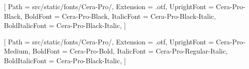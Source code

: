 
\contourlength{0.8pt}

\renewcommand{\ULdepth}{3.8pt}


\contourlength{0.8pt}

\renewcommand{\ULdepth}{3.8pt}

[
Path = src/static/fonts/Cera-Pro/,
Extension = .otf,
UprightFont = Cera-Pro-Black,
BoldFont = Cera-Pro-Black,
ItalicFont = Cera-Pro-Black-Italic,
BoldItalicFont = Cera-Pro-Black-Italic,
]

\setmainfont{Cera-Pro-Medium}[
Path = src/static/fonts/Cera-Pro/,
Extension = .otf,
UprightFont = Cera-Pro-Medium,
BoldFont = Cera-Pro-Bold,
ItalicFont = Cera-Pro-Regular-Italic,
BoldItalicFont = Cera-Pro-Black-Italic,
]
